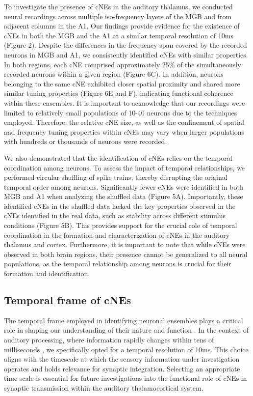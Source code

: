 \documentclass[11pt]{article}
\begin{document}
To investigate the presence of cNEs in the auditory thalamus, we conducted neural recordings across multiple iso-frequency layers of the MGB and from adjacent columns in the A1. Our findings provide evidence for the existence of cNEs in both the MGB and the A1 at a similar temporal resolution of 10ms (Figure 2). Despite the differences in the frequency span covered by the recorded neurons in MGB and A1, we consistently identified cNEs with similar properties. In both regions, each cNE comprised approximately 25\% of the simultaneously recorded neurons within a given region (Figure 6C). In addition, neurons belonging to the same cNE exhibited closer spatial proximity and shared more similar tuning properties (Figure 6E and F), indicating functional coherence within these ensembles. It is important to acknowledge that our recordings were limited to relatively small populations of 10-40 neurons due to the techniques employed. Therefore, the relative cNE size, as well as the confinement of spatial and frequency tuning properties within cNEs may vary when larger populations with hundreds or thousands of neurons were recorded.

We also demonstrated that the identification of cNEs relies on the temporal coordination among neurons. To assess the impact of temporal relationships, we performed circular shuffling of spike trains, thereby disrupting the original temporal order among neurons. Significantly fewer cNEs were identified in both MGB and A1 when analyzing the shuffled data (Figure 5A). Importantly, these identified cNEs in the shuffled data lacked the key properties observed in the cNEs identified in the real data, such as stability across different stimulus conditions (Figure 5B). This provides support for the crucial role of temporal coordination in the formation and characterization of cNEs in the auditory thalamus and cortex. Furthermore, it is important to note that while cNEs were observed in both brain regions, their presence cannot be generalized to all neural populations, as the temporal relationship among neurons is crucial for their formation and identification.

\subsection*{Temporal frame of cNEs}
The temporal frame employed in identifying neuronal ensembles plays a critical role in shaping our understanding of their nature and function \citep{Buzsaki2010}. In the context of auditory processing, where information rapidly changes within tens of milliseconds \citep{lewicki2002efficient, rosen1992temporal}, we specifically opted for a temporal resolution of 10ms. This choice aligns with the timescale at which the sensory information under investigation operates and holds relevance for synaptic integration. Selecting an appropriate time scale is essential for future investigations into the functional role of cNEs in synaptic transmission within the auditory thalamocortical system.
\end{document}
